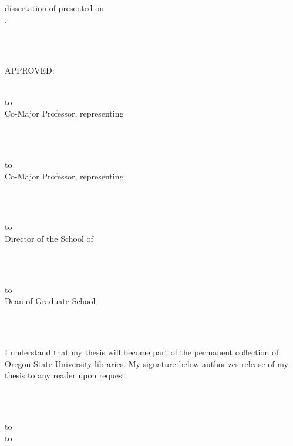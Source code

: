 
\thispagestyle{empty}
{\baselineskip=14.5pt
\def\ruleline{\hbox to \hsize{\hrulefill}\\[-2ex]}
\noindent \uline{\mydegree} dissertation of \uline{\myname}
presented on \\ \uline{\myday}.
\strut\\
\strut\\
APPROVED:\\
\strut\\
\ruleline
Co-Major Professor, representing \mymajor\\
\strut\\
\strut\\
\ruleline
Co-Major Professor, representing \twomymajor\\
\strut\\
\strut\\
\ruleline
Director of the School of \mydepart\\
\strut\\
\strut\\
\ruleline
Dean of Graduate School\\
\strut\\
\strut\\
I understand that my thesis will become part of the permanent collection of
Oregon State University libraries.  My signature below authorizes release of
my thesis to any reader upon request.
\strut\\
\strut\\
\ruleline
\hbox to \textwidth{\hfil \myname, Author \hfil}
}
